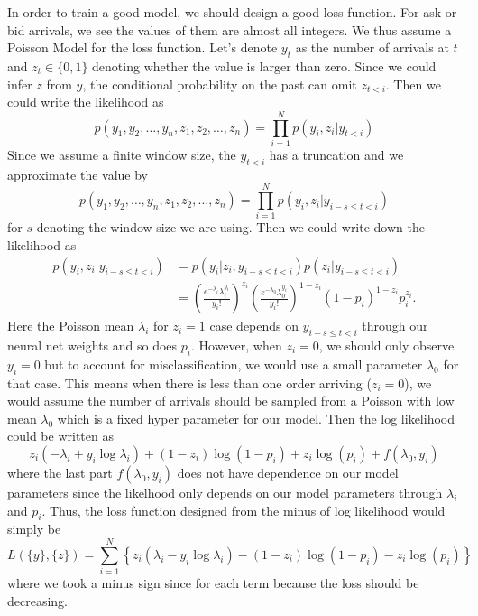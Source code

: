 \documentclass[letterpaper,12pt]{article}
\numberwithin{equation}{section}
\begin{document}
In order to train a good model, we should design a good loss function. For ask or bid arrivals, we see the values of them are almost all integers. We thus assume a Poisson Model for the loss function. Let's denote $y_t$ as the number of arrivals at $t$ and $z_t\in \{0,1\}$ denoting whether the value is larger than zero. Since we could infer $z$ from $y$, the conditional probability on the past can omit $z_{t<i}$. Then we could write the likelihood as 
\begin{equation}
    p(y_1,y_2,\dots, y_n, z_1, z_2, \dots, z_n) = \prod_{i=1}^N p(y_i, z_i | y_{t<i} )
\end{equation}
Since we assume a finite window size, the $y_{t<i}$ has a truncation and we approximate the value by 
\begin{equation}
    p(y_1,y_2,\dots, y_n, z_1, z_2, \dots, z_n) = \prod_{i=1}^N p(y_i, z_i | y_{i-s\leq t<i} )
\end{equation}
for $s$ denoting the window size we are using. Then we could write down the likelihood as
\begin{equation}
\begin{aligned}
    p(y_i, z_i | y_{i-s\leq t<i} ) &= p(y_i| z_i, y_{i-s\leq t<i} ) p(z_i| y_{i-s\leq t<i} ) \\
    &= \left(\frac{e^{-\lambda_i} \lambda_i ^{y_i} }{y_i!} \right)^{z_i} \left(\frac{e^{-\lambda_0} \lambda_0 ^{y_i} }{y_i!} \right)^{1-z_i} (1- p_i)^{1-z_i} p_i^{z_i}.
\end{aligned}
\end{equation}
Here the Poisson mean $\lambda_i$ for $z_i = 1$ case depends on $y_{i-s\leq t<i}$ through our neural net weights and so does $p_i$. However, when $z_i =0$, we should only observe $y_i = 0$ but to account for misclassification, we would use a small parameter $\lambda_0$ for that case. This means when there is less than one order arriving ($z_i = 0$), we would assume the number of arrivals should be sampled from a Poisson with low mean $\lambda_0$ which is a fixed hyper parameter for our model. Then the log likelihood could be written as 
\begin{equation}
    z_i(-\lambda_i + y_i \log \lambda_i) + (1-z_i)\log(1-p_i) + z_i\log(p_i) + f(\lambda_0, y_i)
\end{equation}
where the last part $f(\lambda_0, y_i)$ does not have dependence on our model parameters since the likelhood only depends on our model parameters through $\lambda_i$ and $p_i$. Thus, the loss function designed from the minus of log likelihood would simply be
\begin{equation}
    L(\{y\}, \{z\}) = \sum_{i=1}^N \left\{ z_i(\lambda_i - y_i \log \lambda_i) - (1-z_i)\log(1-p_i) -z_i\log(p_i) \right\}
\end{equation}
where we took a minus sign since for each term because the loss should be decreasing. 
\end{document}
